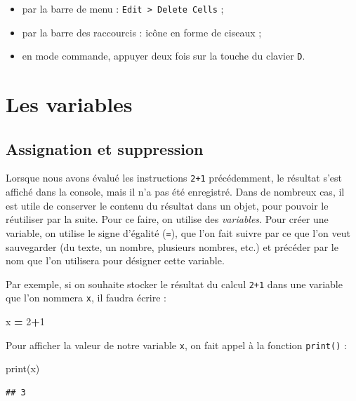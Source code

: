 \documentclass[
  12pt,
]{book}
\newenvironment{Shaded}{\begin{snugshade}}{\end{snugshade}}
\newcommand{\BuiltInTok}[1]{#1}
\newcommand{\DecValTok}[1]{\textcolor[rgb]{0.00,0.00,0.81}{#1}}
\newcommand{\NormalTok}[1]{#1}
\newcommand{\OperatorTok}[1]{\textcolor[rgb]{0.81,0.36,0.00}{\textbf{#1}}}
\providecommand{\tightlist}{%
  \setlength{\itemsep}{0pt}\setlength{\parskip}{0pt}}
\numberwithin{equation}{section}
\numberwithin{countremarque}{section}
\begin{document}
\begin{itemize}
\tightlist
\item
  par la barre de menu : \texttt{Edit\ \textgreater{}\ Delete\ Cells} ;
\item
  par la barre des raccourcis : icône en forme de ciseaux ;
\item
  en mode commande, appuyer deux fois sur la touche du clavier \texttt{D}.
\end{itemize}

\section{Les variables}\label{les-variables}

\subsection{Assignation et suppression}\label{assignation-et-suppression}

Lorsque nous avons évalué les instructions \texttt{2+1} précédemment, le résultat s'est affiché dans la console, mais il n'a pas été enregistré. Dans de nombreux cas, il est utile de conserver le contenu du résultat dans un objet, pour pouvoir le réutiliser par la suite. Pour ce faire, on utilise des \emph{variables}. Pour créer une variable, on utilise le signe d'égalité (\texttt{=}), que l'on fait suivre par ce que l'on veut sauvegarder (du texte, un nombre, plusieurs nombres, etc.) et précéder par le nom que l'on utilisera pour désigner cette variable.

Par exemple, si on souhaite stocker le résultat du calcul \texttt{2+1} dans une variable que l'on nommera \texttt{x}, il faudra écrire :

\begin{Shaded}
\begin{Highlighting}[]
\NormalTok{x }\OperatorTok{=} \DecValTok{2}\OperatorTok{+}\DecValTok{1}
\end{Highlighting}
\end{Shaded}

Pour afficher la valeur de notre variable \texttt{x}, on fait appel à la fonction \texttt{print()} :

\begin{Shaded}
\begin{Highlighting}[]
\BuiltInTok{print}\NormalTok{(x)}
\end{Highlighting}
\end{Shaded}

\begin{lstlisting}
## 3
\end{lstlisting}
\end{document}
